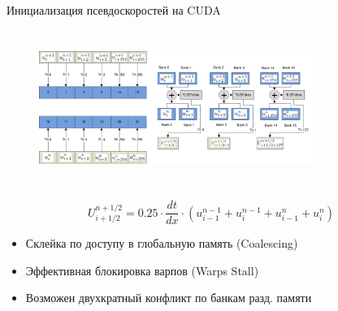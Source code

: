 \begin{frame}{Инициализация псевдоскоростей на CUDA}

\begin{figure}
\includegraphics[height=2in, width=3.5in]{artwork/pdf/uu_init}
\label{fig:wrf-equations}
\end{figure}

\[ U^{n+1/2}_{i+1/2}=0.25 \cdot \frac{dt}{dx} \cdot(u^{n-1}_{i-1} + u^{n-1}_{i} + u^{n}_{i-1} + u^{n}_{i}) \]


\begin{itemize}
  \item Склейка по доступу в глобальную память (Coalescing)
  \item Эффективная блокировка варпов (Warps Stall)
  \item Возможен двухкратный конфликт по банкам разд. памяти
\end{itemize}

\end{frame}

